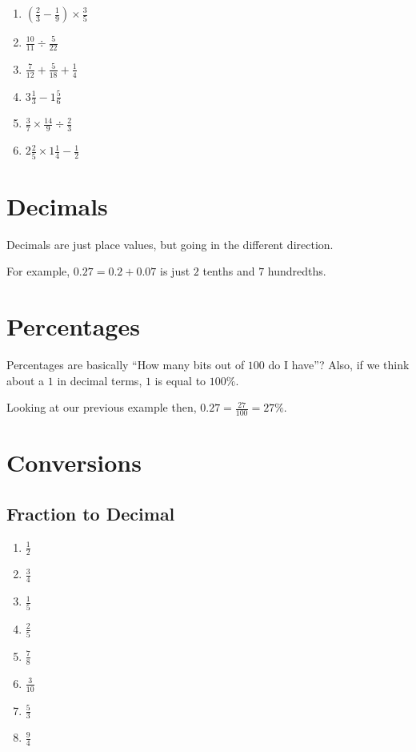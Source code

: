 \documentclass{article}
\theoremstyle{mytheoremstyle}
\theoremstyle{mytheoremstyle}
\theoremstyle{myproblemstyle}
\theoremstyle{myproblemstyle}
\begin{document}
\begin{enumerate}
        \item $\left(\frac{2}{3} - \frac{1}{9}\right) \times \frac{3}{5}$ \hfill \item $\frac{10}{11} \div \frac{5}{22}$ \hfill
        \item $\frac{7}{12} + \frac{5}{18} + \frac{1}{4}$ \hfill \item $3\frac{1}{3} - 1\frac{5}{6}$ \hfill
        \item $\frac{3}{7} \times \frac{14}{9} \div \frac{2}{3}$ \hfill \item $2\frac{2}{5} \times 1\frac{1}{4} - \frac{1}{2}$ \hfill
        \end{enumerate}

    \section{Decimals}
    Decimals are just place values, but going in the different direction.

    For example, $0.27 = 0.2 + 0.07$ is just $2$ tenths and $7$ hundredths.

    \section{Percentages}

    Percentages are basically ``How many bits out of $100$ do I have''? Also, if we think about a $1$ in decimal terms, $1$ is equal to $100\%$.

    Looking at our previous example then, $0.27 = \frac{27}{100} = 27\%$.


    \section{Conversions}

    \subsection{Fraction to Decimal}
        \begin{enumerate}
            \item $\frac{1}{2}$ \hfill \item $\frac{3}{4}$ \hfill \item $\frac{1}{5}$ \hfill \item $\frac{2}{5}$ \hfill
            \item $\frac{7}{8}$ \hfill \item $\frac{3}{10}$ \hfill \item $\frac{5}{3}$ \hfill \item $\frac{9}{4}$ \hfill
        \end{enumerate}
\end{document}
